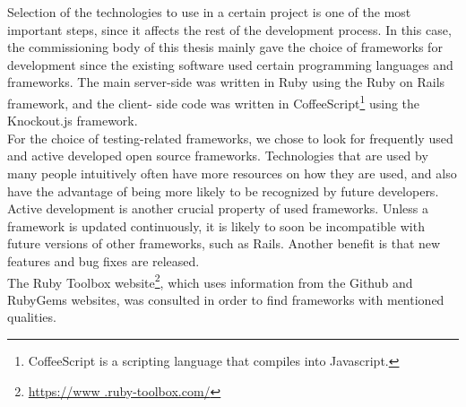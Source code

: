 
Selection of the technologies to use in a certain project is one of the
most important steps, since it affects the rest of the development
process. In this case, the commissioning body of this thesis mainly gave
the choice of frameworks for development since the existing software
used certain programming languages and frameworks. The main server-side
was written in Ruby using the Ruby on Rails framework, and the client-
side code was written in CoffeeScript\footnote{CoffeeScript is a
scripting language that compiles into Javascript.} using the
Knockout.js framework.\\

For the choice of testing-related frameworks, we chose to look for
frequently used and active developed open source frameworks.
Technologies that are used by many people intuitively often have more
resources on how they are used, and also have the advantage of being
more likely to be recognized by future developers.\\

Active development is another crucial property of used frameworks.
Unless a framework is updated continuously, it is likely to soon be
incompatible with future versions of other frameworks, such as Rails.
Another benefit is that new features and bug fixes are released.\\

The Ruby Toolbox website\footnote{\url{https://www .ruby-toolbox.com/}},
which uses information from the Github and RubyGems websites, was
consulted in order to find frameworks with mentioned qualities.\\

